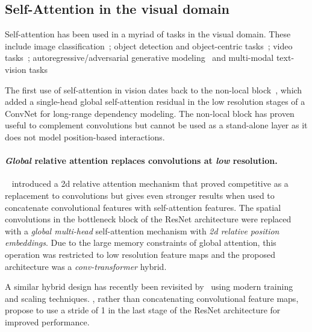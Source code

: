 \documentclass{article} \usepackage{iclr2021_conference,times}
\begin{document}
\vspace{-0.1cm}
\subsection{Self-Attention in the visual domain~\label{sec:self_attention_vision}}
Self-attention has been used in a myriad of tasks in the visual domain.
These include
image classification~\citep{bello2019aacn,ramachandran2019sasa,cordonnier2019relationship,zhao2020exploring,wu2020visual,dosovitskiy2020image}; 
object detection and object-centric tasks~\citep{wang2018non,hu2018relation,carion2020endtoend,locatello2020objectcentric}; video tasks~\citep{sun2019videobert,liao2019videobased};
autoregressive/adversarial generative modeling~\citep{parmar2018image,zhang2019selfattention,brock2019large,chen2020igpt} and
multi-modal text-vision tasks~\citep{chen2020uniter,lu2019vilbert,li2019visualbert,radford2021clip}

The first use of self-attention in vision dates back to the non-local block~\citep{wang2018non}, which added a single-head global self-attention residual in the low resolution stages of a ConvNet for long-range dependency modeling. 
The non-local block has proven useful to complement convolutions but cannot be used as a stand-alone layer as it does not model position-based interactions.

\paragraph{\emph{Global} relative attention replaces convolutions at \emph{low} resolution.}
~\cite{bello2019aacn} introduced a 2d relative attention mechanism that proved competitive as a replacement to convolutions but gives even stronger results when used to concatenate convolutional features with self-attention features.
The spatial convolutions in the bottleneck block of the ResNet architecture were replaced with a \emph{global multi-head} self-attention mechanism with \emph{2d relative position embeddings}.
Due to the large memory constraints of global attention, this operation was restricted to low resolution feature maps and the proposed architecture was a \emph{conv-transformer} hybrid.

A similar hybrid design has recently been revisited by~\cite{srinivas2021bottleneck} using modern training and scaling techniques. 
\cite{srinivas2021bottleneck}, rather than concatenating convolutional feature maps, propose to use a stride of 1 in the last stage of the ResNet architecture for improved performance.
\end{document}
